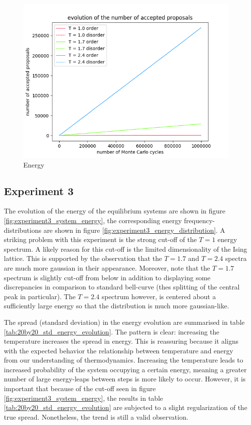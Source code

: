 \documentclass[nofootinbib,reprint,english]{revtex4-1}
\begin{document}
\begin{figure}
\centering
\includegraphics[scale=0.5]{../output/figures/experiment2/accepted.png}
\caption{Energy}\label{fig:experiment2_accepted}
\end{figure}

\subsection{Experiment 3}
The evolution of the energy of the equilibrium systems are shown in figure \ref{fig:experiment3_system_energy}, the corresponding energy frequency-distributions are shown in figure \ref{fig:experiment3_energy_distribution}. A striking problem with this experiment is the strong cut-off of the \(T=1\) energy spectrum. A likely reason for this cut-off is the limited dimensionality of the Ising lattice. This is supported by the observation that the \(T=1.7\) and \(T=2.4\) spectra are much more gaussian in their appearance. Moreover, note that the \(T=1.7\) spectrum is slightly cut-off from below in addition to displaying some discrepancies in comparison to standard bell-curve (thes splitting of the central peak in particular). The \(T=2.4\) spectrum however, is centered about a sufficiently large energy so that the distribution is much more gaussian-like. 

The spread (standard deviation) in the energy evolution are summarised in table \ref{tab:20by20_std_energy_evolution}. The pattern is clear: increasing the temperature increases the spread in energy. This is reassuring because it aligns with the expected behavior the relationship between temperature and energy from our understanding of thermodynamics. Increasing the temperature leads to increased probability of the system occupying a certain energy, meaning a greater number of large energy-leaps between steps is more likely to occur. However, it is important that because of the cut-off seen in figure \ref{fig:experiment3_system_energy}, the results in table \ref{tab:20by20_std_energy_evolution} are subjected to a slight regularization of the true spread. Nonetheless, the trend is still a valid observation.
\end{document}
